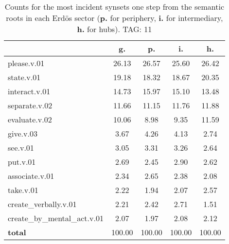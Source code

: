 \begin{table}[h!]
\begin{center}
\begin{tabular}{| l || c | c | c | c |}\hline
 & {\bf g.} & {\bf p.} & {\bf i.} & {\bf h.} \\\hline\hline
please.v.01 & 26.13  & 26.57  & 25.60  & 26.42 \\\hline
state.v.01 & 19.18  & 18.32  & 18.67  & 20.35 \\\hline
interact.v.01 & 14.73  & 15.97  & 15.10  & 13.48 \\\hline
separate.v.02 & 11.66  & 11.15  & 11.76  & 11.88 \\\hline
evaluate.v.02 & 10.06  & 8.98  & 9.35  & 11.59 \\\hline
give.v.03 & 3.67  & 4.26  & 4.13  & 2.74 \\\hline
see.v.01 & 3.05  & 3.31  & 3.26  & 2.64 \\\hline
put.v.01 & 2.69  & 2.45  & 2.90  & 2.62 \\\hline
associate.v.01 & 2.34  & 2.65  & 2.38  & 2.08 \\\hline
take.v.01 & 2.22  & 1.94  & 2.07  & 2.57 \\\hline
create\_verbally.v.01 & 2.21  & 2.42  & 2.71  & 1.51 \\\hline
create\_by\_mental\_act.v.01 & 2.07  & 1.97  & 2.08  & 2.12 \\\hline\hline
{{\bf total}} & 100.00  & 100.00  & 100.00  & 100.00 \\\hline
\end{tabular}
\caption{Counts for the most incident synsets one step from the semantic roots in each Erd\"os sector ({\bf p.} for periphery, {\bf i.} for intermediary, {\bf h.} for hubs). TAG: 11}
\end{center}
\end{table}